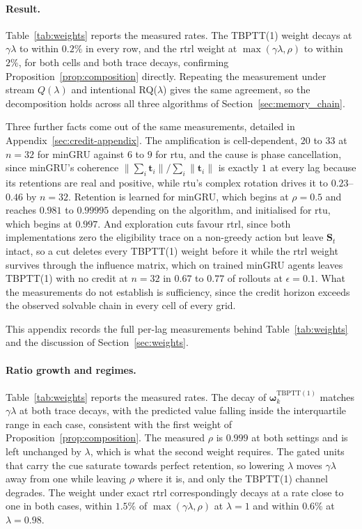\documentclass{article}
\begin{document}
\paragraph{Result.}
Table~\ref{tab:weights} reports the measured rates. The TBPTT(1) weight decays at
$\gamma\lambda$ to within $0.2\%$ in every row, and the \gls{rtrl} weight at
$\max(\gamma\lambda,\rho)$ to within $2\%$, for both cells and both trace decays, confirming
Proposition~\ref{prop:composition} directly. Repeating the measurement under stream
$Q(\lambda)$ and intentional RQ($\lambda$) gives the same agreement, so the decomposition holds
across all three algorithms of Section~\ref{sec:memory_chain}.

Three further facts come out of the same measurements, detailed in
Appendix~\ref{sec:credit-appendix}. The amplification is cell-dependent, $20$ to $33$ at
$n{=}32$ for minGRU against $6$ to $9$ for \gls{rtu}, and the cause is phase cancellation, since
minGRU's coherence $\|\sum_i \boldsymbol{t}_i\| / \sum_i \|\boldsymbol{t}_i\|$ is exactly $1$ at
every lag because its retentions are real and positive, while \gls{rtu}'s complex rotation
drives it to $0.23$--$0.46$ by $n{=}32$. Retention is learned for minGRU, which begins at
$\rho{=}0.5$ and reaches $0.981$ to $0.99995$ depending on the algorithm, and initialised for
\gls{rtu}, which begins at $0.997$. And exploration cuts favour \gls{rtrl}, since both implementations
zero the eligibility trace on a non-greedy action but leave $\boldsymbol{S}_t$ intact, so a cut
deletes every TBPTT(1) weight before it while the \gls{rtrl} weight survives through the
influence matrix, which on trained minGRU agents leaves TBPTT(1) with no credit at $n{=}32$ in
$0.67$ to $0.77$ of rollouts at $\epsilon{=}0.1$. What the measurements do not establish is
sufficiency, since the credit horizon exceeds the observed solvable chain in every cell of every grid.





This appendix records the full per-lag measurements behind Table~\ref{tab:weights} and the
discussion of Section~\ref{sec:weights}.

\paragraph{Ratio growth and regimes.}
Table~\ref{tab:weights} reports the measured rates. The decay of
$\boldsymbol{\omega}_k^{\mathrm{TBPTT(1)}}$ matches $\gamma\lambda$ at both trace
decays, with the predicted value falling inside the interquartile range in each
case, consistent with the first weight of Proposition~\ref{prop:composition}.
The measured $\rho$ is $0.999$ at both settings and is left unchanged by
$\lambda$, which is what the second weight requires. The gated units that carry
the cue saturate towards perfect retention, so lowering $\lambda$ moves
$\gamma\lambda$ away from one while leaving $\rho$ where it is, and only the
TBPTT(1) channel degrades. The weight under exact \gls{rtrl} correspondingly
decays at a rate close to one in both cases, within $1.5\%$ of
$\max(\gamma\lambda,\rho)$ at $\lambda{=}1$ and within $0.6\%$ at
$\lambda{=}0.98$.
\end{document}
